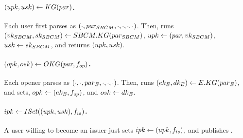 
\paragraph{$(upk,usk) \gets KG(par)$.} %
Each user first parses \parm as $(\cdot,par_{SBCM},\cdot,\cdot,\cdot,\cdot)$.
Then, runs $(vk_{SBCM},sk_{SBCM}) \gets SBCM.KG(par_{SBCM})$, $upk \gets (par,
vk_{SBCM})$, $usk \gets sk_{SBCM}$, and returns $(upk,usk)$.

\paragraph{$(opk,osk) \gets OKG(par,f_{op})$.} %
Each opener parses \parm as $(\cdot,\cdot,par_{E},\cdot,\cdot,\cdot)$.
Then, runs $(ek_{E},dk_{E}) \gets E.KG(par_{E})$, and sets, $opk \gets (ek_{E},
f_{op})$, and $osk \gets dk_{E}$.

\paragraph{$ipk \gets ISet((upk,usk),f_{is})$.} %
A user willing to become an issuer just sets $ipk \gets (upk,f_{is})$, and
publishes \ipk.

